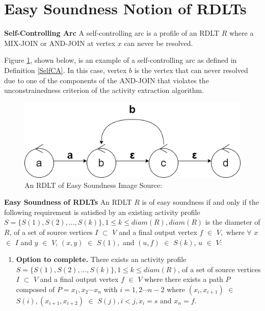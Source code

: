 \section{Easy Soundness Notion of RDLTs}

\begin{defn}\textbf{Self-Controlling Arc}
    \label{SelfCA}
    A self-controlling arc is a profile of an RDLT $ R $ where a MIX-JOIN or AND-JOIN at vertex $ x $ can never be resolved. 
\end{defn}

Figure \ref{SelfControllingArc}, shown below, is an example of a self-controlling arc as defined in Definition \ref{SelfCA}. In this case, vertex $ b $ is the vertex that can never resolved due to one of the components of the AND-JOIN that violates the unconstrainedness criterion of the activity extraction algorithm.

\begin{figure}[H]
    \centering
    \includegraphics[width=12cm]{../figures/Self-Controlling Loop.png}
    \caption{An RDLT of Easy Soundness Image Source: \cite{Ramirez2024}}
    \label{SelfControllingArc}
\end{figure}

\begin{defn}\textbf{Easy Soundness of RDLTs}
    \label{EasyRDLTDef}
    An RDLT $ R $ is of easy soundness if and only if the following requirement is satisfied by an existing activity profile $ S = \{S(1), S(2), ..., S(k)\}, 1 \leq k \leq diam(R), diam(R) $ is the diameter of $ R $, of a set of source vertices $ I $ $ \subset $ $ V $ and a final output vertex $ f $ $ \in $ $ V, $ where $ \forall $ $ x $ $ \in $ $ I $ and $ y $ $ \in $ $ V $, $ (x,y) $ $ \in $ $ S(1), $ and $ (u,f) $ $ \in $ $ S(k) $, $ u $ $ \in $ $ V $:
    \begin{enumerate}
        \item \textbf{Option to complete.} There exists an activity profile $ S = \{S(1), S(2), ..., S(k)\}, 1 \leq k \leq diam(R) $, of a set of source vertices $ I $ $ \subset $ $ V $ and a final output vertex $ f $ $ \in $ $ V $ where there exists a path $ P $ composed of $ P = x_1, x_2 \cdots x_n $ with $ i = 1, 2 \cdots n - 2 $ where $ (x_i, x_{i+1}) $ $ \in $ $ S(i), (x_{i+1}, x_{i+2}) $ $ \in $ $ S(j), i < j, x_i = s $ and $ x_n = f $.
    \end{enumerate}
\end{defn}

